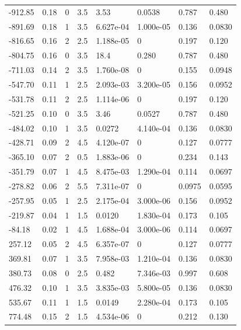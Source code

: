 \documentclass[preview]{standalone}
\begin{document}
{{\begin{tabular}{L{1.2cm}C{1.2cm} C{0.3cm}C{0.5cm} C{1.4cm}C{1.4cm} C{1.4cm}C{1.4cm}}
  -912.85  &  0.18  & 0     & 3.5 &  3.53  & 0.0538  & 0.787 &  0.480   \\ 
  -891.69  &  0.18  & 1     & 3.5 &  6.627e-04  & 1.000e-05  & 0.136 &  0.0830   \\ 
  -816.65  &  0.16  & 2     & 2.5 &  1.188e-05  & 0  & 0.197 &  0.120   \\ 
  -804.75  &  0.16  & 0     & 3.5 &  18.4  & 0.280  & 0.787 &  0.480   \\ 
  -711.03  &  0.14  & 2     & 3.5 &  1.760e-08  & 0  & 0.155 &  0.0948   \\ 
  -547.70  &  0.11  & 1     & 2.5 &  2.093e-03  & 3.200e-05  & 0.156 &  0.0952   \\ 
  -531.78  &  0.11  & 2     & 2.5 &  1.114e-06  & 0  & 0.197 &  0.120   \\ 
  -521.25  &  0.10  & 0     & 3.5 &  3.46  & 0.0527  & 0.787 &  0.480   \\ 
  -484.02  &  0.10  & 1     & 3.5 &  0.0272  & 4.140e-04  & 0.136 &  0.0830   \\ 
  -428.71  &  0.09  & 2     & 4.5 &  4.120e-07  & 0  & 0.127 &  0.0777   \\ 
  -365.10  &  0.07  & 2     & 0.5 &  1.883e-06  & 0  & 0.234 &  0.143   \\ 
  -351.79  &  0.07  & 1     & 4.5 &  8.475e-03  & 1.290e-04  & 0.114 &  0.0697   \\ 
  -278.82  &  0.06  & 2     & 5.5 &  7.311e-07  & 0  & 0.0975 &  0.0595   \\ 
  -257.95  &  0.05  & 1     & 2.5 &  2.175e-04  & 3.000e-06  & 0.156 &  0.0952   \\ 
  -219.87  &  0.04  & 1     & 1.5 &  0.0120  & 1.830e-04  & 0.173 &  0.105   \\ 
  -84.18  &  0.02  & 1     & 4.5 &  1.688e-04  & 3.000e-06  & 0.114 &  0.0697   \\ 
  257.12  &  0.05  & 2     & 4.5 &  6.357e-07  & 0  & 0.127 &  0.0777   \\ 
  369.81  &  0.07  & 1     & 3.5 &  7.958e-03  & 1.210e-04  & 0.136 &  0.0830   \\ 
  380.73  &  0.08  & 0     & 2.5 &  0.482  & 7.346e-03  & 0.997 &  0.608   \\ 
  476.32  &  0.10  & 1     & 3.5 &  3.835e-03  & 5.800e-05  & 0.136 &  0.0830   \\ 
  535.67  &  0.11  & 1     & 1.5 &  0.0149  & 2.280e-04  & 0.173 &  0.105   \\ 
  774.48  &  0.15  & 2     & 1.5 &  4.534e-06  & 0  & 0.212 &  0.130   \\ 

\end{tabular}}}
\end{document}
